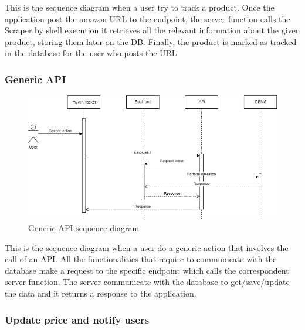 This is the sequence diagram when a user try to track a product. Once the application post the amazon URL to the endpoint, the server function calls the Scraper by shell execution it retrieves all the relevant information about the given product, storing them later on the DB. Finally, the product is marked as tracked in the database for the user who posts the URL.

\subsubsection{Generic API}

\begin{figure}[h!]
        \centering
        \includegraphics[scale=0.40]{images/runtime_view/generic_api.png}
        \caption{Generic API sequence diagram}
        \label{fig:generic_api_sequence_diagram}
\end{figure}
\FloatBarrier

This is the sequence diagram when a user do a generic action that involves the call of an API.
All the functionalities that require to communicate with the database make a request to the specific endpoint which calls the correspondent server function. The server communicate with the database to get/save/update the data and it returns a response to the application.

\subsubsection{Update price and notify users}

